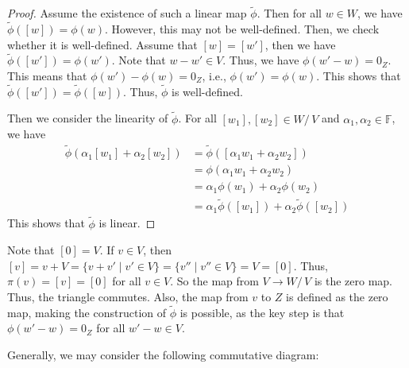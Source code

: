 \documentclass[
	11pt, %
	fleqn, %
	a4paper, %
]{LegrandOrangeBook}
\renewcommand{\Im}[1]{\text{Im}(#1)} %
\newcommand{\quotient}[2]{#1 /\, #2} %
\newcommand{\F}{\mathbb{F}} %
\newcommand{\coker}[1]{\text{Coker}(#1)} %
\begin{document}
\begin{proof}
    Assume the existence of such a linear map $\tilde{\phi}$. Then for all $w \in W$, we have $\tilde{\phi}([w]) = \phi(w)$. However, this may not be well-defined. Then, we check whether it is well-defined. Assume that $[w] = [w']$, then we have $\tilde{\phi}([w']) = \phi(w')$. Note that $w - w' \in V$. Thus, we have $\phi(w' - w) = 0_Z$. This means that $\phi(w') - \phi(w) = 0_Z$, i.e., $\phi(w') = \phi(w)$. This shows that $\tilde{\phi}([w']) = \tilde{\phi}([w])$. Thus, $\tilde{\phi}$ is well-defined.

    Then we consider the linearity of $\tilde{\phi}$. For all $[w_1], [w_2] \in \quotient{W}{V}$ and $\alpha_1, \alpha_2 \in \F$, we have
    \[
        \begin{split}
            \tilde{\phi}(\alpha_1 [w_1] + \alpha_2 [w_2]) &= \tilde{\phi}([\alpha_1 w_1 + \alpha_2 w_2]) \\
            &= \phi(\alpha_1 w_1 + \alpha_2 w_2) \\
            &= \alpha_1 \phi(w_1) + \alpha_2 \phi(w_2) \\
            &= \alpha_1 \tilde{\phi}([w_1]) + \alpha_2 \tilde{\phi}([w_2])
        \end{split}
    \]
    This shows that $\tilde{\phi}$ is linear.
\end{proof}

\begin{remark}
    Note that $[0] = V$. If $v \in V$, then $[v] = v + V = \{v + v' \mid v' \in V\} = \{v'' \mid v'' \in V\} = V = [0]$. Thus, $\pi(v) = [v] = [0]$ for all $v \in V$. So the map from $V \to \quotient{W}{V}$ is the zero map. Thus, the triangle commutes. Also, the map from $v$ to $Z$ is defined as the zero map, making the construction of $\tilde{\phi}$ is possible, as the key step is that $\phi(w' - w) = 0_Z$ for all $w' - w \in V$.
\end{remark}

\newpage

Generally, we may consider the following commutative diagram:

\begin{center}
\end{center}
\end{document}
